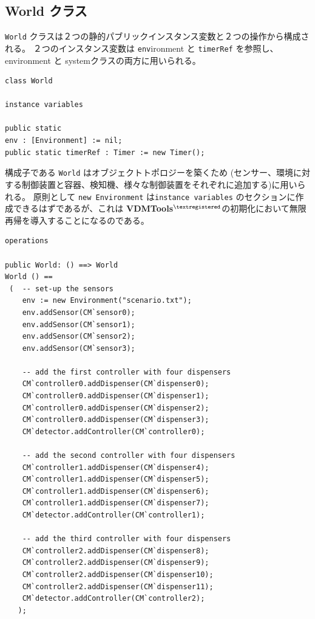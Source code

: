\documentclass[\pformat,12pt]{jreport}
\newcommand{\vdmtools}{\textbf{VDMTools}$^{\mathbf{{\textregistered}}}$}
\begin{document}
\subsection{World クラス}

 \texttt{World} クラスは２つの静的パブリックインスタンス変数と２つの操作から構成される。
２つのインスタンス変数は \texttt{env}ironment と \texttt{timerRef} を参照し、environment と systemクラスの両方に用いられる。

\begin{lstlisting}
class World

instance variables
  
public static 
env : [Environment] := nil;
public static timerRef : Timer := new Timer();
\end{lstlisting}

構成子である \texttt{World} はオブジェクトトポロジーを築くため (センサー、環境に対する制御装置と容器、検知機、様々な制御装置をそれぞれに追加する)に用いられる。
原則として \texttt{new Environment} は\texttt{instance variables} のセクションに作成できるはずであるが、これは \vdmtools の初期化において無限再帰を導入することになるのである。

\begin{lstlisting}
operations

public World: () ==> World
World () ==
 (  -- set-up the sensors
    env := new Environment("scenario.txt");
    env.addSensor(CM`sensor0);
    env.addSensor(CM`sensor1);
    env.addSensor(CM`sensor2);
    env.addSensor(CM`sensor3);

    -- add the first controller with four dispensers
    CM`controller0.addDispenser(CM`dispenser0);
    CM`controller0.addDispenser(CM`dispenser1);
    CM`controller0.addDispenser(CM`dispenser2);
    CM`controller0.addDispenser(CM`dispenser3);
    CM`detector.addController(CM`controller0);

    -- add the second controller with four dispensers
    CM`controller1.addDispenser(CM`dispenser4);
    CM`controller1.addDispenser(CM`dispenser5);
    CM`controller1.addDispenser(CM`dispenser6);
    CM`controller1.addDispenser(CM`dispenser7);
    CM`detector.addController(CM`controller1);
 
    -- add the third controller with four dispensers
    CM`controller2.addDispenser(CM`dispenser8);
    CM`controller2.addDispenser(CM`dispenser9);
    CM`controller2.addDispenser(CM`dispenser10);
    CM`controller2.addDispenser(CM`dispenser11);
    CM`detector.addController(CM`controller2);
   );
\end{lstlisting}
\end{document}
